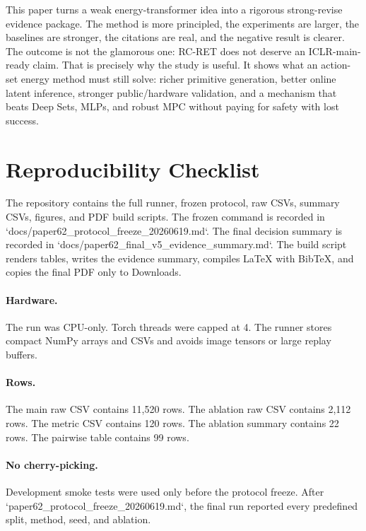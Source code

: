 \documentclass{article}
\newcommand{\method}{RC-RET}
\begin{document}
This paper turns a weak energy-transformer idea into a rigorous strong-revise evidence package.  The method is more principled, the experiments are larger, the baselines are stronger, the citations are real, and the negative result is clearer.  The outcome is not the glamorous one: \method{} does not deserve an ICLR-main-ready claim.  That is precisely why the study is useful.  It shows what an action-set energy method must still solve: richer primitive generation, better online latent inference, stronger public/hardware validation, and a mechanism that beats Deep Sets, MLPs, and robust MPC without paying for safety with lost success.

\clearpage
\appendix

\section{Reproducibility Checklist}

The repository contains the full runner, frozen protocol, raw CSVs, summary CSVs, figures, and PDF build scripts.  The frozen command is recorded in `docs/paper62\_protocol\_freeze\_20260619.md`.  The final decision summary is recorded in `docs/paper62\_final\_v5\_evidence\_summary.md`.  The build script renders tables, writes the evidence summary, compiles LaTeX with BibTeX, and copies the final PDF only to Downloads.

\paragraph{Hardware.}
The run was CPU-only.  Torch threads were capped at 4.  The runner stores compact NumPy arrays and CSVs and avoids image tensors or large replay buffers.

\paragraph{Rows.}
The main raw CSV contains 11,520 rows.  The ablation raw CSV contains 2,112 rows.  The metric CSV contains 120 rows.  The ablation summary contains 22 rows.  The pairwise table contains 99 rows.

\paragraph{No cherry-picking.}
Development smoke tests were used only before the protocol freeze.  After `paper62\_protocol\_freeze\_20260619.md`, the final run reported every predefined split, method, seed, and ablation.
\end{document}
